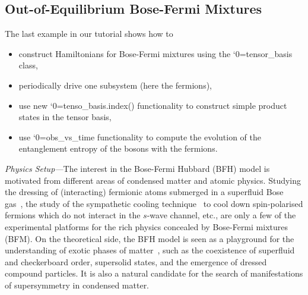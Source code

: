 \documentclass{SciPost}
\newcommand\0{\scalebox{-1}[1]{0}}
\let\svttfamily\ttfamily
\renewcommand\ttfamily{\svttfamily\catcode`0=\active }
\renewcommand\texttt{\bgroup\ttfamily\texttthelp}
\def\texttthelp#1{#1\egroup}
\begin{document}
\subsection{Out-of-Equilibrium Bose-Fermi Mixtures}
\label{subsec:BF_mixtures}

The last example in our tutorial shows how to
\begin{itemize}
	\item construct Hamiltonians for Bose-Fermi mixtures using the \texttt{tensor\_basis} class,
	\item periodically drive one subsystem (here the fermions),
	\item use new \texttt{tenso\_basis.index()} functionality to construct simple product states in the tensor basis,
	\item use \texttt{obs\_vs\_time} functionality to compute the evolution of the entanglement entropy of the bosons with the fermions.
\end{itemize}

\noindent\emph{Physics Setup---}The interest in the Bose-Fermi Hubbard (BFH) model is motivated from different areas of condensed matter and atomic physics. Studying the dressing of (interacting) fermionic atoms submerged in a superfluid Bose gas~\cite{grusdt_15}, the study of the sympathetic cooling technique~\cite{ketterle_08} to cool down spin-polarised fermions which do not interact in the $s$-wave channel, etc., are only a few of the experimental platforms for the rich physics concealed by Bose-Fermi mixtures (BFM). On the theoretical side, the BFH model is seen as a playground for the understanding of exotic phases of matter~\cite{stasyuk_15,bilitewski_15,scaramazza_16,bukov_14_BFM}, such as the coexistence of superfluid and checkerboard order, supersolid states, and the emergence of dressed compound particles. It is also a natural candidate for the search of manifestations of supersymmetry in condensed matter.
\end{document}
